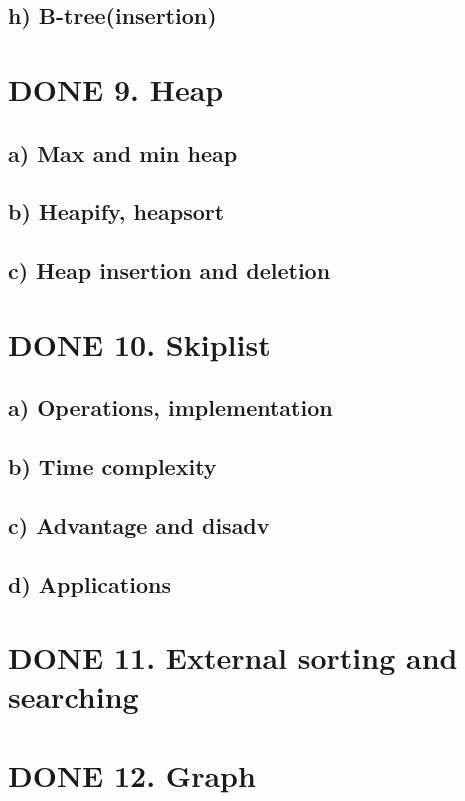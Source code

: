 \documentclass[11pt]{article}
\begin{document}
\subsection{h) B-tree(insertion)}
\label{sec:orgeed1d08}
\section{{\bfseries\sffamily DONE} 9. Heap}
\label{sec:orge31fd4e}
\subsection{a) Max and min heap}
\label{sec:org1b37569}
\subsection{b) Heapify, heapsort}
\label{sec:org618c93e}
\subsection{c) Heap insertion and deletion}
\label{sec:org781abc0}
\section{{\bfseries\sffamily DONE} 10. Skiplist}
\label{sec:orgad5c5d3}
\subsection{a) Operations, implementation}
\label{sec:orgd4fa227}
\subsection{b) Time complexity}
\label{sec:org7d76234}
\subsection{c) Advantage and disadv}
\label{sec:org0f62530}
\subsection{d) Applications}
\label{sec:orgeb05356}
\section{{\bfseries\sffamily DONE} 11. External sorting and searching}
\label{sec:org689276d}
\section{{\bfseries\sffamily DONE} 12. Graph}
\label{sec:org25901ef}
\end{document}
